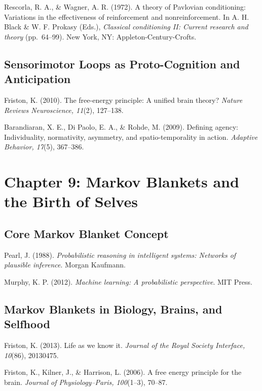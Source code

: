 \documentclass[
  openright]{book}
\begin{document}
Rescorla, R. A., \& Wagner, A. R. (1972). A theory of Pavlovian
conditioning: Variations in the effectiveness of reinforcement and
nonreinforcement. In A. H. Black \& W. F. Prokasy (Eds.),
\emph{Classical conditioning II: Current research and theory}
(pp.~64--99). New York, NY: Appleton-Century-Crofts.

\subsection{Sensorimotor Loops as Proto-Cognition and
Anticipation}\label{sensorimotor-loops-as-proto-cognition-and-anticipation}

Friston, K. (2010). The free-energy principle: A unified brain theory?
\emph{Nature Reviews Neuroscience, 11}(2), 127--138.

Barandiaran, X. E., Di Paolo, E. A., \& Rohde, M. (2009). Defining
agency: Individuality, normativity, asymmetry, and spatio-temporality in
action. \emph{Adaptive Behavior, 17}(5), 367--386.

\section{Chapter 9: Markov Blankets and the Birth of
Selves}\label{chapter-9-markov-blankets-and-the-birth-of-selves-1}

\subsection{Core Markov Blanket
Concept}\label{core-markov-blanket-concept-1}

Pearl, J. (1988). \emph{Probabilistic reasoning in intelligent systems:
Networks of plausible inference}. Morgan Kaufmann.

Murphy, K. P. (2012). \emph{Machine learning: A probabilistic
perspective}. MIT Press.

\subsection{Markov Blankets in Biology, Brains, and
Selfhood}\label{markov-blankets-in-biology-brains-and-selfhood-1}

Friston, K. (2013). Life as we know it. \emph{Journal of the Royal
Society Interface, 10}(86), 20130475.

Friston, K., Kilner, J., \& Harrison, L. (2006). A free energy principle
for the brain. \emph{Journal of Physiology--Paris, 100}(1--3), 70--87.
\end{document}
